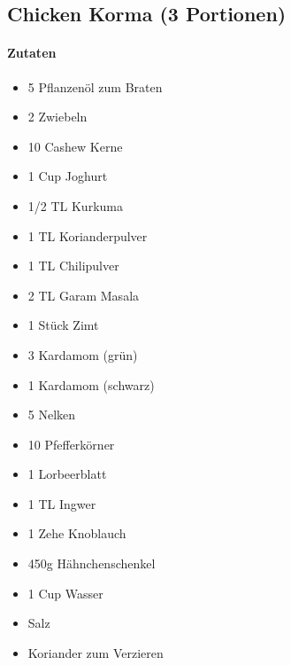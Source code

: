 \newpage
\subsection{Chicken Korma (3 Portionen)}
\paragraph{Zutaten}
\begin{itemize}[noitemsep]
	\item 5 Pflanzenöl zum Braten
	\item 2 Zwiebeln
	\item 10 Cashew Kerne
	\item 1 Cup Joghurt
	\item 1/2 TL Kurkuma
	\item 1 TL Korianderpulver
	\item 1 TL Chilipulver
	\item 2 TL Garam Masala
	\item 1 Stück Zimt
	\item 3 Kardamom (grün)
	\item 1 Kardamom (schwarz)
	\item 5 Nelken
	\item 10 Pfefferkörner
	\item 1 Lorbeerblatt
	\item 1 TL Ingwer 
	\item 1 Zehe Knoblauch
	\item 450g Hähnchenschenkel
	\item 1 Cup Wasser
	\item Salz
	\item Koriander zum Verzieren
\end{itemize}
